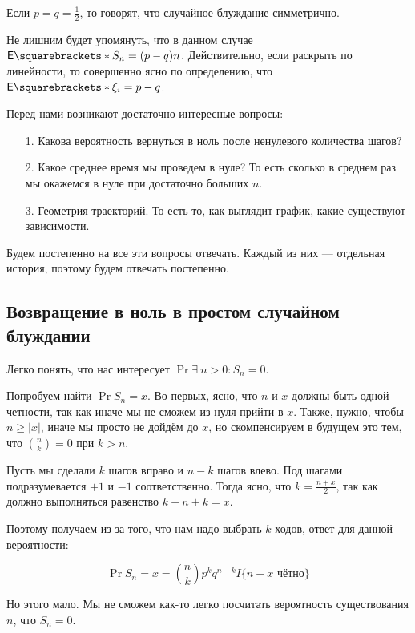 \begin{definition}
  Если $p = q = \frac{1}{2}$, то говорят, что случайное блуждание симметрично.
\end{definition}

\begin{remark}
  Не лишним будет упомянуть, что в данном случае $\E{S_n} = (p - q)n$. 
  Действительно, если раскрыть по линейности, то совершенно ясно по 
  определению, что $\E{\xi_i} = p - q$.
\end{remark}

Перед нами возникают достаточно интересные вопросы:

\begin{itemize}
  \item[1.] Какова вероятность вернуться в ноль после ненулевого количества шагов?
  \item[2.] Какое среднее время мы проведем в нуле? 
  То есть сколько в среднем раз мы окажемся в нуле при достаточно больших $n$.
  \item[3.] Геометрия траекторий. То есть то, как выглядит график, какие существуют зависимости.
\end{itemize}

Будем постепенно на все эти вопросы отвечать. Каждый из них --- отдельная
история, поэтому будем отвечать постепенно.

\subsection{Возвращение в ноль в простом случайном блуждании}

Легко понять, что нас интересует $\Pr{\exists \ n > 0 : S_n = 0}$.

Попробуем найти $\Pr{S_n = x}$. Во-первых, ясно, что $n$ и $x$ должны
быть одной четности, так как иначе мы не сможем из нуля прийти в $x$.
Также, нужно, чтобы $n \geq |x|$, иначе мы просто не дойдём до 
$x$, но скомпенсируем в будущем это тем, что $\binom{n}{k} = 0$ при $k > n$.

Пусть мы сделали $k$ шагов вправо и $n - k$ шагов влево. Под шагами 
подразумевается $+1$ и $-1$ соответственно. Тогда ясно, что
$k = \frac{n + x}{2}$, так как должно выполняться равенство $k - n + k = x$.

Поэтому получаем из-за того, что нам надо выбрать $k$ ходов, ответ для данной вероятности:

\[
  \Pr{S_n = x} = \binom{n}{k}p^kq^{n - k}I\{n + x \text{ чётно}\}
\]

Но этого мало. Мы не сможем как-то легко посчитать вероятность существования $n$, что $S_n = 0$.

